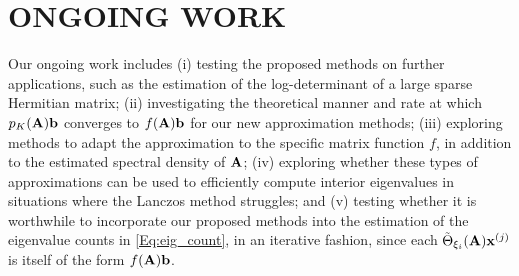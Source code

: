 \documentclass{article}
\begin{document}



\section{ONGOING WORK} \label{Sec:ongoing}

Our ongoing work includes (i) testing the proposed methods on further applications, such as the estimation of the log-determinant of a large sparse Hermitian matrix; (ii) investigating the theoretical manner and rate at which $p_K({\bf A}){\bf b}$ converges to $f({\bf A}){\bf b}$ for our new approximation methods; (iii) exploring methods to adapt the approximation to the specific matrix function $f$, in addition to the estimated spectral density of ${\bf A}$; (iv) exploring whether these types of approximations can be used to efficiently compute interior eigenvalues in situations where the Lanczos method struggles; and (v) testing whether it is worthwhile to incorporate our proposed methods into the estimation of the eigenvalue counts in \eqref{Eq:eig_count}, in an iterative fashion, since each $\tilde{\Theta}_{\xi_i}({\bf A}){\bf x}^{(j)}$ is itself of the form $f({\bf A}){\bf b}$. 
\end{document}

